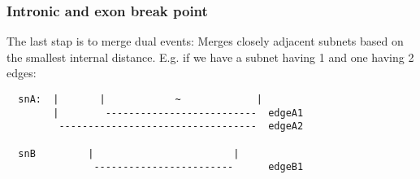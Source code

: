 \documentclass{article}
\theoremstyle{definition}
\begin{document}
\subsubsection{Intronic and exon break point}
The last stap is to merge dual events:
Merges closely adjacent subnets based on the smallest internal distance.
E.g. if we have a subnet having 1 and one having 2 edges:

\begin{verbatim}
  snA:  |       |            ~             |
        |        --------------------------  edgeA1
         ----------------------------------  edgeA2

  snB         |                        |
               ------------------------      edgeB1


\end{verbatim}        
\end{document}
